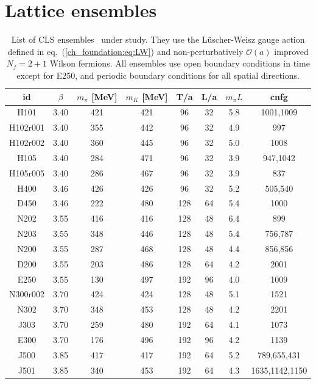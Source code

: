 
\chapter{Lattice ensembles}
\label{apex_ensembles}

\begin{table}[H]
\label{apex_ensembles:tab:ens}
\begin{center}
    \begin{tabular}{c c c c c c c c}
    id & $\beta$ & $m_{\pi}$ [MeV] & $m_K$ [MeV] & T/a & L/a & $m_{\pi}L$ & cnfg \\
    \hline
    H101 & 3.40 & 421 & 421 & 96 & 32 & 5.8 & 1001,1009 \\
    H102r001 & 3.40 & 355 & 442 & 96 & 32 & 4.9 & 997 \\
    H102r002 & 3.40 & 360 & 445 & 96 & 32 & 5.0 & 1008 \\
    H105 & 3.40 & 284 & 471 & 96 & 32 & 3.9 & 947,1042 \\
    H105r005 & 3.40 & 286 & 467 & 96 & 32 & 3.9 & 837 \\
    \hline
    H400 & 3.46 & 426 & 426 & 96 & 32 & 5.2 & 505,540 \\
    D450 & 3.46 & 222 & 480 & 128 & 64 & 5.4 & 1000 \\
    \hline
    N202 & 3.55 & 416 & 416 & 128 & 48 & 6.4 & 899 \\
    N203 & 3.55 & 348 & 446 & 128 & 48 & 5.4 & 756,787 \\
    N200 & 3.55 & 287 & 468 & 128 & 48 & 4.4 & 856,856 \\
    D200 & 3.55 & 203 & 486 & 128 & 64 & 4.2 & 2001 \\
    E250 & 3.55 & 130 & 497 & 192 & 96 & 4.0 & 1009\\
    \hline
    N300r002 & 3.70 & 424 & 424 & 128 & 48 & 5.1 & 1521 \\
    N302 & 3.70 & 348 & 453 & 128 & 48 & 4.2 & 2201 \\
    J303 & 3.70 & 259 & 480 & 192 & 64 & 4.1 & 1073 \\
    E300 & 3.70 & 176 & 496 & 192 & 96 & 4.2 & 1139 \\ 
    \hline
    J500 & 3.85 & 417 & 417 & 192 & 64 & 5.2 & 789,655,431 \\
    J501 & 3.85 & 340 & 453 & 192 & 64 & 4.3 & 1635,1142,1150 \\
    \hline
    \end{tabular}
    \caption{List of CLS ensembles~\cite{} under study. They use the Lüscher-Weisz gauge action defined in eq.~(\ref{ch_foundation:eq:LW}) and non-perturbatively $\mathcal{O}(a)$ improved $N_f=2+1$ Wilson fermions. All ensembles use open boundary conditions in time except for E250, and periodic boundary conditions for all spatial directions.}
\end{center}
\end{table}


